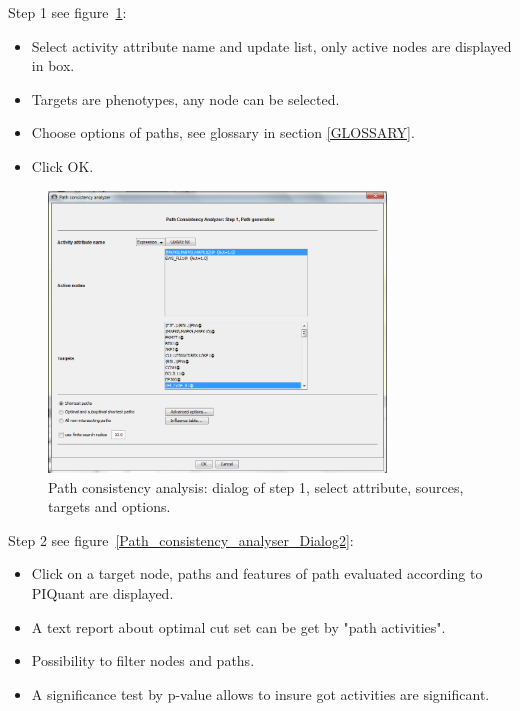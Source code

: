 Step 1 see figure~\ref{Path_consistency_analyser_Dialog1}:
\begin{itemize}
\item Select activity attribute name and update list, only active nodes are displayed in box.
\item Targets are phenotypes, any node can be selected.
\item Choose options of paths, see glossary in section \ref{GLOSSARY}.
\item  Click OK.
\end{itemize}
\begin{figure}
\centering
\includegraphics[width=0.8\textwidth]{graphics/Path_consistency_analyser_Dialog1}
\caption{Path consistency analysis: dialog of step 1, select attribute, sources, targets and options.}
\label{Path_consistency_analyser_Dialog1}
\end{figure}
Step 2 see figure~\ref{Path_consistency_analyser_Dialog2}:
\begin{itemize}
\item Click on a target node, paths and features of path evaluated according to PIQuant are displayed.
\item A text report about optimal cut set can be get by "path activities".
\item Possibility to filter nodes and paths.
\item A  significance test by  p-value allows to insure got activities are significant.
\end{itemize}
